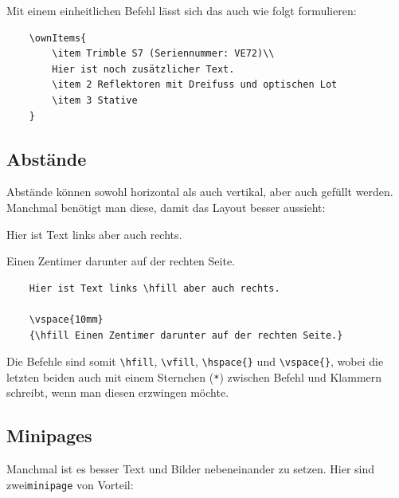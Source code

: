 Mit einem einheitlichen Befehl lässt sich das auch wie folgt formulieren:

\begin{verbatim}
    \ownItems{
        \item Trimble S7 (Seriennummer: VE72)\\
        Hier ist noch zusätzlicher Text.
        \item 2 Reflektoren mit Dreifuss und optischen Lot
        \item 3 Stative
    }
\end{verbatim}


\subsection{Abstände}

Abstände können sowohl horizontal als auch vertikal, aber auch gefüllt werden. Manchmal benötigt man diese, damit das Layout besser aussieht:

Hier ist Text links \hfill aber auch rechts.

\vspace{10mm}
{\hfill Einen Zentimer darunter auf der rechten Seite.}

\begin{verbatim}
    Hier ist Text links \hfill aber auch rechts.

    \vspace{10mm}
    {\hfill Einen Zentimer darunter auf der rechten Seite.}
\end{verbatim}

Die Befehle sind somit \verb|\hfill|, \verb|\vfill|, \verb|\hspace{}| und \verb|\vspace{}|, wobei die letzten beiden auch mit einem Sternchen (\verb|*|) zwischen Befehl und Klammern schreibt, wenn man diesen erzwingen möchte.


\subsection{Minipages}

Manchmal ist es besser Text und Bilder nebeneinander zu setzen. Hier sind zwei\linebreak \verb|minipage| von Vorteil:\\

